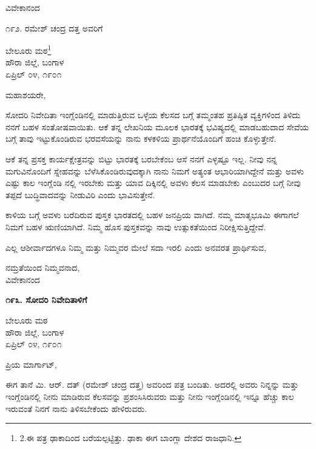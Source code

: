 \begin{flushright}
ವಿವೇಕಾನಂದ
\end{flushright}

೧೯೨. ರಮೇಶ್ ಚಂದ್ರ ದತ್ತ \textbf{} ಅವರಿಗೆ

\begin{flushright}
ಬೇಲೂರು ಮಠ\footnote{2.ಈ ಪತ್ರ ಢಾಕಾದಿಂದ ಬರೆಯಲ್ಪಟ್ಟಿತ್ತು. ಢಾಕಾ ಈಗ ಬಾಂಗ್ಲಾ ದೇಶದ ರಾಜಧಾನಿ.}\\ಹೌರಾ ಜಿಲ್ಲೆ, ಬಂಗಾಳ\\ಏಪ್ರಿಲ್ ೦೪, ೧೯೦೧
\end{flushright}

ಮಹಾಶಯರೇ,

ಸೋದರಿ ನಿವೇದಿತಾ ಇಂಗ್ಲೆಂಡಿನಲ್ಲಿ ಮಾಡುತ್ತಿರುವ ಒಳ್ಳೆಯ ಕೆಲಸದ ಬಗ್ಗೆ ತಮ್ಮಂತಹ ಪ್ರತಿಷ್ಠಿತ ವ್ಯಕ್ತಿಗಳಿಂದ ತಿಳಿದು ನನಗೆ ಬಹಳ ಸಂತೋಷವಾಯಿತು. ಆಕೆ ತನ್ನ ಲೇಖನಿಯ ಮೂಲಕ ಭಾರತಕ್ಕೆ ಭವಿಷ್ಯದಲ್ಲಿ ಮಾಡಬಹುದಾದ ಸೇವೆಯ ಬಗ್ಗೆ ತಾವು ಇಟ್ಟುಕೊಂಡಿರುವ ಭರವಸೆಯನ್ನು ನಾನು ಕಳಕಳಿಯ ಪ್ರಾರ್ಥನೆಯೊಂದಿಗೆ ಹಂಚಿ ಕೊಳ್ಳುತ್ತೇನೆ.

ಆಕೆ ತನ್ನ ಪ್ರಸಕ್ತ ಕಾರ್ಯಕ್ಷೇತ್ರವನ್ನು ಬಿಟ್ಟು ಭಾರತಕ್ಕೆ ಬರಬೇಕೆಂಬ ಆಸೆ ನನಗೆ ಎಳ್ಳಷ್ಟೂ ಇಲ್ಲ. ನೀವು ನನ್ನ ಮಗುವಿನೊಂದಿಗೆ ಸ್ನೇಹವನ್ನು ಬೆಳೆಸಿಕೊಂಡಿರುವುದಕ್ಕಾಗಿ ನಾನು ನಿಮಗೆ ಅತ್ಯಂತ ಆಭಾರಿಯಾಗಿದ್ದೇನೆ ಮತ್ತು ಅವಳು ಎಷ್ಟು ಕಾಲ ಇಂಗ್ಲೆಂಡಿ ನಲ್ಲಿ ಇರಬೇಕು ಮತ್ತು ಯಾವ ದಿಕ್ಕಿನಲ್ಲಿ ಅವಳು ಕೆಲಸ ಮಾಡಬೇಕು ಎಂಬುದರ ಬಗ್ಗೆ ನೀವು ತಪ್ಪದೆ ಬುದ್ಧಿವಾದವನ್ನು ನೀಡುವಿರಿ ಎಂದು ಭಾವಿಸುತ್ತೇನೆ.

ಕಾಳಿಯ ಬಗ್ಗೆ ಅವಳು ಬರೆದಿರುವ ಪುಸ್ತಕ ಭಾರತದಲ್ಲಿ ಬಹಳ ಜನಪ್ರಿಯ ವಾಗಿದೆ. ನಮ್ಮ ಮಾತೃಭೂಮಿ ಈಗಾಗಲೆ ನಿಮಗೆ ಬಹಳ ಋಣಿಯಾಗಿದೆ. ನಿಮ್ಮ ಹೊಸ ಪುಸ್ತಕವನ್ನು ನಾವು ಉತ್ಸುಕತೆಯಿಂದ ನಿರೀಕ್ಷಿಸುತ್ತಿದ್ದೇವೆ.

ಎಲ್ಲ ಆಶೀರ್ವಾದಗಳೂ ನಿಮ್ಮ ಮತ್ತು ನಿಮ್ಮವರ ಮೇಲೆ ಸದಾ ಇರಲಿ ಎಂದು ಅನವರತ ಪ್ರಾರ್ಥಿಸುವ,

\begin{flushright}
ನಮ್ರತೆಯಿಂದ ನಿಮ್ಮವನಾದ,\\ವಿವೇಕಾನಂದ
\end{flushright}

\begin{center}
\textbf{೧೯೩. ಸೋದರಿ ನಿವೇದಿತಾಳಿಗೆ}
\end{center}

\begin{flushright}
ಬೇಲೂರು ಮಠ\\ಹೌರಾ ಜಿಲ್ಲೆ, ಬಂಗಾಳ\\ಏಪ್ರಿಲ್ ೦೪, ೧೯೦೧
\end{flushright}

ಪ್ರಿಯ ಮಾರ್ಗಾಟ್,

ಈಗ ತಾನೆ ಮಿ. ಆರ್. ದತ್ (ರಮೇಶ್ ಚಂದ್ರ ದತ್ತ) ಅವರಿಂದ ಪತ್ರ ಬಂದಿತು. ಅದರಲ್ಲಿ ಅವರು ನಿನ್ನನ್ನು ಮತ್ತು ಇಂಗ್ಲೆಂಡಿನಲ್ಲಿ ನೀನು ಮಾಡಿರುವ ಕೆಲಸವನ್ನು ಪ್ರಶಂಸಿಸಿರುವರು ಮತ್ತು ನೀನು ಇಂಗ್ಲೆಂಡಿನಲ್ಲಿ ಇನ್ನೂ ಹೆಚ್ಚು ಕಾಲ ಇರುವಂತೆ ನಿನಗೆ ನಾನು ತಿಳಿಸಬೇಕೆಂದು ಹೇಳಿರುವರು.

